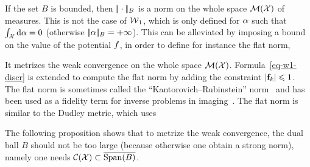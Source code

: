 \begin{example}
If the set $B$ is bounded, then $|\!| \cdot |\!|_B$ is a norm on the whole space $\mathcal{M}(\mathcal{X})$ of measures.
%
This is not the case of $\operatorname{\mathcal{W}}_1$, which is only defined for $\alpha$ such that $\int_{\mathcal{X}} \mathrm{d}\alpha=0$ (otherwise $|\!| \alpha |\!|_B=+\infty$). 
%
This can be alleviated by imposing a bound on the value of the potential $f$, in order to define for instance the flat norm, 
 
It metrizes the weak convergence on the whole space $\mathcal{M}(\mathcal{X})$.
% 
Formula~\eqref{eq-w1-discr} is extended to compute the flat norm by adding the constraint $\left\lvert\mathrm{\textbf{\upshape f}}_k\right\rvert \leqslant 1$.
%
The flat norm is sometimes called the ``Kantorovich--Rubinstein'' norm~\cite{hanin1992kantorovich} and has been used as a fidelity term for inverse problems in imaging~\cite{lellmann2014imaging}.
%
The flat norm is  similar to the Dudley metric, which uses
\end{example}

The following proposition shows that to metrize the weak convergence, the dual ball $B$ should not be too large (because otherwise one obtain a strong norm), namely one needs $\mathcal{C}(\mathcal{X}) \subset \overline{\operatorname{Span}(B)}$.

